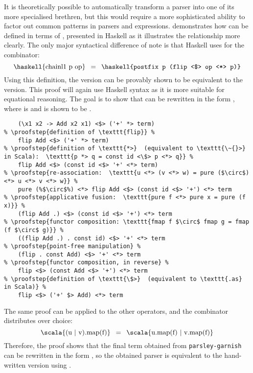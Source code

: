 \documentclass[../../main.tex]{subfiles}
\begin{document}
It is theoretically possible to automatically transform a  parser into one of its more specialised brethren, but this would require a more sophisticated ability to factor out common patterns in parsers and expressions.
\textcite{willis_parsley_2024} demonstrates how  can be defined in terms of , presented in Haskell as it illustrates the relationship more clearly.
The only major syntactical difference of note is that Haskell uses \haskell{<$>} for the  combinator:
\begin{equation*}
\text{\haskell{chainl1 p op}} \enspace = \enspace \text{\haskell{postfix p (flip <$> op <*> p)}}
\end{equation*}
%
Using this definition, the  version can be provably shown to be equivalent to the  version.
This proof will again use Haskell syntax as it is more suitable for equational reasoning.
The goal is to show that  can be rewritten in the form , where  is  and  is shown to be .
\begin{lstlisting}
    (\x1 x2 -> Add x2 x1) <$> ('+' *> term)
% \proofstep{definition of \texttt{flip}} %
    flip Add <$> ('+' *> term)
% \proofstep{definition of \texttt{*>}  (equivalent to \texttt{\~{}>} in Scala):  \texttt{p *> q = const id <\$> p <*> q}} %
    flip Add <$> (const id <$> '+' <*> term)
% \proofstep{re-association:  \texttt{u <*> (v <*> w) = pure ($\circ$) <*> u <*> v <*> w}} %
    pure (%$\circ$%) <*> flip Add <$> (const id <$> '+') <*> term
% \proofstep{applicative fusion:  \texttt{pure f <*> pure x = pure (f x)}} %
    (flip Add .) <$> (const id <$> '+') <*> term
% \proofstep{functor composition: \texttt{fmap f $\circ$ fmap g = fmap (f $\circ$ g)}} %
    ((flip Add .) . const id) <$> '+' <*> term
% \proofstep{point-free manipulation} %
    (flip . const Add) <$> '+' <*> term
% \proofstep{functor composition, in reverse} %
    flip <$> (const Add <$> '+') <*> term
% \proofstep{definition of \texttt{\$>}  (equivalent to \texttt{.as} in Scala)} %
    flip <$> ('+' $> Add) <*> term
\end{lstlisting}
%
The same proof can be applied to the other operators, and the  combinator distributes over choice:
\begin{equation*}
\text{\scala{(u | v).map(f)}} \enspace = \enspace \text{\scala{u.map(f) | v.map(f)}}
\end{equation*}
%
Therefore, the proof shows that the final term obtained from \texttt{parsley-garnish} can be rewritten in the form , so the obtained  parser is equivalent to the hand-written version using .
\end{document}
